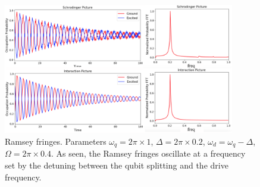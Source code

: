 \documentclass[aps,prl,onecolumn,notitlepage,showpacs,floatfix,superscriptaddress]{revtex4-1}
\begin{document}
 \begin{figure}[hbtp]
 \centering
 \includegraphics[width=0.9\textwidth]{plots.png}
 \caption{Ramsey fringes. Parameters $\omega_q = 2\pi\times 1$, $\Delta = 2\pi \times 0.2$, $\omega_d = \omega_q-\Delta$, $\Omega = 2\pi \times 0.4$. As seen, the Ramsey fringes oscillate at a frequency set by the detuning between the qubit splitting and the drive frequency.}
 \end{figure}
  
\end{document}
